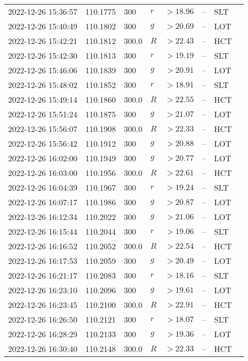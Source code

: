 \documentclass{nature_plusfigure}
\begin{document}
\begin{supplement}
\begin{center}
\begin{longtable}{llllllll}
2022-12-26 15:36:57 & 110.1775 & 300 & $r$ & $>18.96$ & -- & SLT &  \\ 
2022-12-26 15:40:49 & 110.1802 & 300 & $g$ & $>20.69$ & -- & LOT &  \\ 
2022-12-26 15:42:21 & 110.1812 & 300.0 & $R$ & $>22.43$ & -- & HCT &  \\ 
2022-12-26 15:42:30 & 110.1813 & 300 & $r$ & $>19.19$ & -- & SLT &  \\ 
2022-12-26 15:46:06 & 110.1839 & 300 & $g$ & $>20.91$ & -- & LOT &  \\ 
2022-12-26 15:48:02 & 110.1852 & 300 & $r$ & $>18.91$ & -- & SLT &  \\ 
2022-12-26 15:49:14 & 110.1860 & 300.0 & $R$ & $>22.55$ & -- & HCT &  \\ 
2022-12-26 15:51:24 & 110.1875 & 300 & $g$ & $>21.07$ & -- & LOT &  \\ 
2022-12-26 15:56:07 & 110.1908 & 300.0 & $R$ & $>22.33$ & -- & HCT &  \\ 
2022-12-26 15:56:42 & 110.1912 & 300 & $g$ & $>20.88$ & -- & LOT &  \\ 
2022-12-26 16:02:00 & 110.1949 & 300 & $g$ & $>20.77$ & -- & LOT &  \\ 
2022-12-26 16:03:00 & 110.1956 & 300.0 & $R$ & $>22.61$ & -- & HCT &  \\ 
2022-12-26 16:04:39 & 110.1967 & 300 & $r$ & $>19.24$ & -- & SLT &  \\ 
2022-12-26 16:07:17 & 110.1986 & 300 & $g$ & $>20.87$ & -- & LOT &  \\ 
2022-12-26 16:12:34 & 110.2022 & 300 & $g$ & $>21.06$ & -- & LOT &  \\ 
2022-12-26 16:15:44 & 110.2044 & 300 & $r$ & $>19.06$ & -- & SLT &  \\ 
2022-12-26 16:16:52 & 110.2052 & 300.0 & $R$ & $>22.54$ & -- & HCT &  \\ 
2022-12-26 16:17:53 & 110.2059 & 300 & $g$ & $>20.49$ & -- & LOT &  \\ 
2022-12-26 16:21:17 & 110.2083 & 300 & $r$ & $>18.16$ & -- & SLT &  \\ 
2022-12-26 16:23:10 & 110.2096 & 300 & $g$ & $>19.61$ & -- & LOT &  \\ 
2022-12-26 16:23:45 & 110.2100 & 300.0 & $R$ & $>22.91$ & -- & HCT &  \\ 
2022-12-26 16:26:50 & 110.2121 & 300 & $r$ & $>18.07$ & -- & SLT &  \\ 
2022-12-26 16:28:29 & 110.2133 & 300 & $g$ & $>19.36$ & -- & LOT &  \\ 
2022-12-26 16:30:40 & 110.2148 & 300.0 & $R$ & $>22.33$ & -- & HCT &  \\ 

\end{longtable}
\end{center}
\end{supplement}
\end{document}
